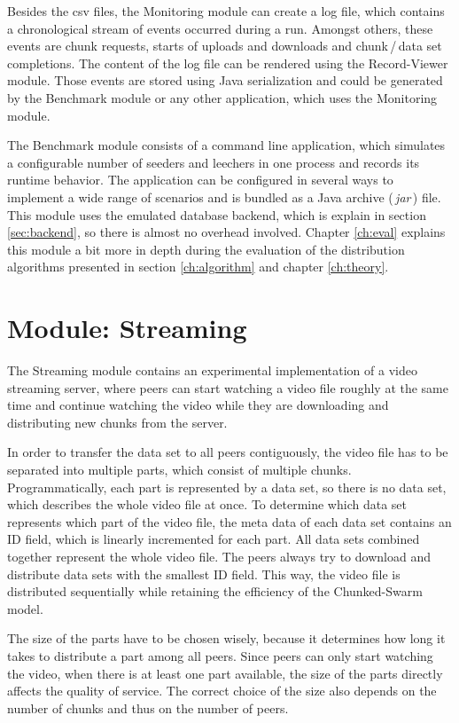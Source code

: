 Besides the csv files, the Monitoring module can create a log file, which contains a chronological stream of events occurred during a run. Amongst others, these events are chunk requests, starts of uploads and downloads and chunk\,/\,data set completions. The content of the log file can be rendered using the Record-Viewer module. Those events are stored using Java serialization and could be generated by the Benchmark module or any other application, which uses the Monitoring module.

The Benchmark module consists of a command line application, which simulates a configurable number of seeders and leechers in one process and records its runtime behavior. The application can be configured in several ways to implement a wide range of scenarios and is bundled as a Java archive (\,\emph{jar}\,) file. This module uses the emulated database backend, which is explain in section \ref{sec:backend}, so there is almost no overhead involved. Chapter \ref{ch:eval} explains this module a bit more in depth during the evaluation of the distribution algorithms presented in section \ref{ch:algorithm} and chapter \ref{ch:theory}.


\chapter{Module: Streaming}
\label{ch:streaming}

The Streaming module contains an experimental implementation of a video streaming server, where peers can start watching a video file roughly at the same time and continue watching the video while they are downloading and distributing new chunks from the server. 

In order to transfer the data set to all peers contiguously, the video file has to be separated into multiple parts, which consist of multiple chunks. Programmatically, each part is represented by a data set, so there is no data set, which describes the whole video file at once. To determine which data set represents which part of the video file, the meta data of each data set contains an ID field, which is linearly incremented for each part. All data sets combined together represent the whole video file. The peers always try to download and distribute data sets with the smallest ID field. This way, the video file is distributed sequentially while retaining the efficiency of the Chunked-Swarm model.

The size of the parts have to be chosen wisely, because it determines how long it takes to distribute a part among all peers. Since peers can only start watching the video, when there is at least one part available, the size of the parts directly affects the quality of service. The correct choice of the size also depends on the number of chunks and thus on the number of peers.

